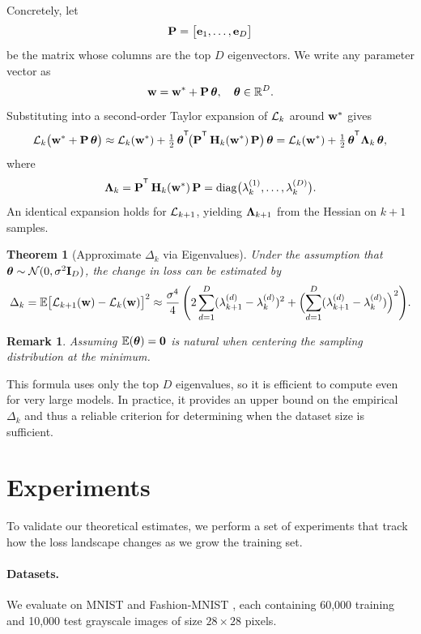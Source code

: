 \documentclass{article}
\newtheorem{theorem}{Theorem} %
\newtheorem{remark}{Remark}
\begin{document}
Concretely, let
$$
  \mathbf{P} =
  \bigl[ \mathbf{e}_1, \dots, \mathbf{e}_D \bigr]
$$
be the matrix whose columns are the top $D$ eigenvectors. We write any parameter vector as
$$
  \mathbf{w} =
  \mathbf{w}^* + \mathbf{P}\, \boldsymbol{\theta}, \quad
  \boldsymbol{\theta} \in \mathbb R^D.
$$
Substituting into a second‑order Taylor expansion of $\mathcal{L}_k$ around $\mathbf{w}^*$ gives
$$
  \cL_k\bigl(\bw^* + \bP\,\btheta\bigr) \approx
  \cL_k(\bw^*) + \tfrac12\, \btheta^{\T}\! \bigl( \bP^{\T}\, \bH_k(\bw^*)\, \bP\bigr)\, \btheta =
  \cL_k(\bw^*) + \tfrac12\, \btheta^{\T} \bLambda_k\, \btheta,
$$
where
$$
  \bLambda_k =
  \bP^{\T}\, \bH_k(\bw^*)\, \bP =
  \operatorname{diag} \bigl( \lambda_k^{(1)}, \dots, \lambda_k^{(D)} \bigr).
$$
An identical expansion holds for $\mathcal{L}_{k+1}$, yielding $\boldsymbol{\Lambda}_{k+1}$ from the Hessian on $k+1$ samples.

\begin{theorem}[Approximate $\Delta_k$ via Eigenvalues]\label{th:th_1}
  Under the assumption that $\boldsymbol{\theta} \sim \mathcal N(0, \sigma^2 \mathbf I_D)$, the change in loss can be estimated by
  $$
    \Delta_k =
    \mathbb E \bigl[ \mathcal{L}_{k+1}(\mathbf{w}) - \mathcal{L}_k(\mathbf{w}) \bigr]^2 \approx
    \frac{\sigma^4}{4}\, \Biggl( 2 \sum_{d=1}^D (\lambda_{k+1}^{(d)} - \lambda_k^{(d)})^2
    + \Bigl( \sum_{d=1}^D (\lambda_{k+1}^{(d)} - \lambda_k^{(d)}) \Bigr)^2 \Biggr).
  $$
\end{theorem}

\begin{remark}
  Assuming $\mathbb{E}(\boldsymbol{\theta}) = \mathbf{0}$ is natural when centering the sampling distribution at the minimum.
\end{remark}

This formula uses only the top $D$ eigenvalues, so it is efficient to compute even for very large models.
In practice, it provides an upper bound on the empirical $\Delta_k$ and thus a reliable criterion for determining when the
dataset size is sufficient.


\section{Experiments}\label{sec:exp}

To validate our theoretical estimates, we perform a set of experiments that track how the loss landscape changes as we grow the
training set.

\paragraph{Datasets.}
We evaluate on MNIST \cite{deng2012mnist} and Fashion‑MNIST \cite{xiao2017fashion}, each containing 60,000 training and 10,000 test
grayscale images of size $28\times28$ pixels.
\end{document}

